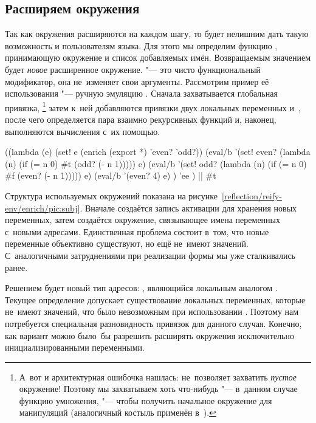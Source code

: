 \subsection{Расширяем окружения}\label{reflection/reify-env/ssect:enrich}

Так как окружения расширяются на каждом шагу, то будет нелишним дать такую
возможность и пользователям языка. Для этого мы определим функцию ,
принимающую окружение и список добавляемых имён. Возвращаемым значением будет
\emph{новое} расширенное окружение.  "--- это чисто функциональный
модификатор, она не~изменяет свои аргументы. Рассмотрим пример её использования
"--- ручную эмуляцию . Сначала захватывается глобальная привязка,%
\footnote*{А~вот и архитектурная ошибочка нашлась:  не~позволяет
захватить \emph{пустое} окружение! Поэтому мы захватываем хоть что-нибудь "---
в~данном случае функцию умножения, "--- чтобы получить начальное окружение для
манипуляций (аналогичный костыль применён в~\cite{qd96}).} затем к~ней
добавляются привязки двух локальных переменных  и~, после
чего определяется пара взаимно рекурсивных функций и, наконец, выполняются
вычисления с~их помощью.

\begin{code:lisp}
((lambda (e)
   (set! e (enrich (export *) 'even? 'odd?))
   (eval/b '(set! even? (lambda (n) (if (= n 0) #t (odd? (- n 1))))) e)
   (eval/b '(set! odd? (lambda (n) (if (= n 0) #f (even? (- n 1))))) e)
   (eval/b '(even? 4) e) )
 'ee )                     |\is| #t
\end{code:lisp}

Структура используемых окружений показана на
рисунке~\ref{reflection/reify-env/enrich/pic:subj}. Вначале создаётся запись
активации для хранения новых переменных, затем создаётся окружение, связывающее
имена переменных с~новыми адресами. Единственная проблема состоит в~том, что
новые переменные объективно существуют, но ещё не~имеют значений. С~аналогичными
затруднениями при реализации формы  мы уже сталкивались ранее.

Решением будет новый тип адресов: , являющийся локальным
аналогом . Текущее определение  допускает
существование локальных переменных, которые не~имеют значений, что было
невозможным при использовании . Поэтому нам потребуется специальная
разновидность привязок для данного случая. Конечно, как вариант можно было~бы
разрешить расширять окружения исключительно инициализированными переменными.

